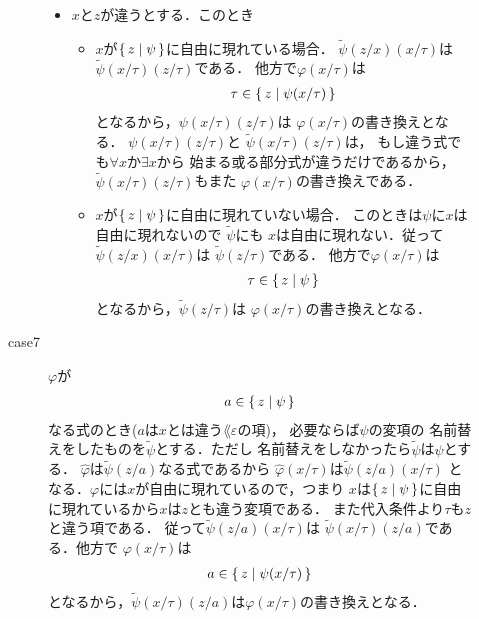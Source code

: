 \begin{metaprf}[第一]
\begin{description}
\begin{description}
\begin{itemize}
							\item $x$と$z$が違うとする．このとき
								\begin{itemize}
									\item $x$が$\{\, z \mid \psi\, \}$に自由に現れている場合．
										$\widetilde{\psi}(z/x)(x/\tau)$は
										$\widetilde{\psi}(x/\tau)(z/\tau)$である．
										他方で$\varphi(x/\tau)$は
										\begin{align}
											\tau \in \{\, z \mid \psi(x/\tau)\, \}
										\end{align}
										となるから，$\psi(x/\tau)(z/\tau)$は
										$\varphi(x/\tau)$の書き換えとなる．
										$\psi(x/\tau)(z/\tau)$と
										$\widetilde{\psi}(x/\tau)(z/\tau)$は，
										もし違う式でも$\forall x$か$\exists x$から
										始まる或る部分式が違うだけであるから，
										$\widetilde{\psi}(x/\tau)(z/\tau)$もまた
										$\varphi(x/\tau)$の書き換えである．
										
									\item $x$が$\{\, z \mid \psi\, \}$に自由に現れていない場合．
										このときは$\psi$に$x$は自由に現れないので
										$\widetilde{\psi}$にも
										$x$は自由に現れない．従って
										$\widetilde{\psi}(z/x)(x/\tau)$は
										$\widetilde{\psi}(z/\tau)$である．
										他方で$\varphi(x/\tau)$は
										\begin{align}
											\tau \in \{\, z \mid \psi\, \}
										\end{align}
										となるから，$\widetilde{\psi}(z/\tau)$は
										$\varphi(x/\tau)$の書き換えとなる．
								\end{itemize}
						\end{itemize}
						
					\item[case7] $\varphi$が
						\begin{align}
							a \in \{\, z \mid \psi\, \}
						\end{align}
						なる式のとき($a$は$x$とは違う$\lang{\varepsilon}$の項)，
						必要ならば$\psi$の変項の
						名前替えをしたものを$\widetilde{\psi}$とする．ただし
						名前替えをしなかったら$\widetilde{\psi}$は$\psi$とする．
						$\widehat{\varphi}$は$\widetilde{\psi}(z/a)$なる式であるから
						$\widehat{\varphi}(x/\tau)$は$\widetilde{\psi}(z/a)(x/\tau)$
						となる．$\varphi$には$x$が自由に現れているので，つまり
						$x$は$\{\, z \mid \psi\, \}$に自由に現れているから$x$は$z$とも違う変項である．
						また代入条件より$\tau$も$z$と違う項である．
						従って$\widetilde{\psi}(z/a)(x/\tau)$は
						$\widetilde{\psi}(x/\tau)(z/a)$である．他方で
						$\varphi(x/\tau)$は
						\begin{align}
							a \in \{\, z \mid \psi(x/\tau)\, \}
						\end{align}
						となるから，$\widetilde{\psi}(x/\tau)(z/a)$は$\varphi(x/\tau)$の書き換えとなる．
					

\end{description}
\end{description}
\end{metaprf}
